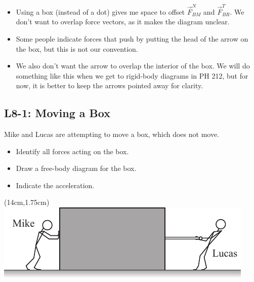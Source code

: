 \documentclass[]{article}
\begin{document}
\begin{TeacherMargin}
\begin{itemize}
	\begin{itemize}
		\item Using a box (instead of a dot) gives me space to offset $\vec{F}^{N}_{BM}$ and $\vec{F}^{T}_{BR}$. We don't want to overlap force vectors, as it makes the diagram unclear.
		\item Some people indicate forces that push by putting the head of the arrow on the box, but this is not our convention.
		\begin{center}
		\end{center}
		\item We also don't want the arrow to overlap the interior of the box. We will do something like this when we get to rigid-body diagrams in PH 212, but for now, it is better to keep the arrows pointed away for clarity.
		\begin{center}
		\end{center}
	\end{itemize}
\end{itemize}
\end{TeacherMargin}
\begin{PresentSpace}
\vspace{-10pt}
\section*{L8-1: Moving a Box}
\vspace{100pt}
Mike and Lucas are attempting to move a box, which does not move.
\begin{itemize}
	\item Identify all forces acting on the box.
	\item Draw a free-body diagram for the box.
	\item Indicate the acceleration.
\end{itemize}
\end{PresentSpace}
\begin{textblock*}{5cm}(14cm,1.75cm)
\centering
\includegraphics[scale=1.5]{Mike_and_Lucas_Fruitlessly_Push_a_Box.pdf}
\end{textblock*}
\end{document}
